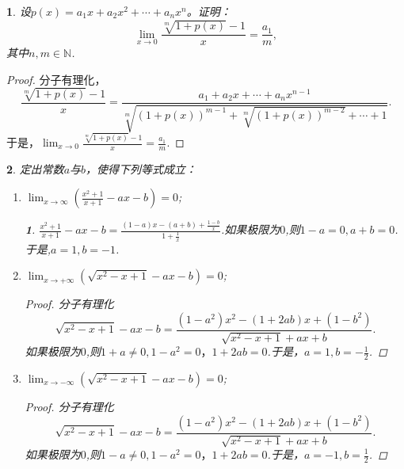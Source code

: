 \documentclass[utf8]{book}
\newtheorem{example}{}[section]             %
\newtheorem{solution}{}
\begin{document}
\begin{example}
设$p(x)=a_1x+a_2x^2+\cdots+a_nx^n$。证明：
$$\displaystyle\lim_{x\to 0}\frac{\sqrt[m]{1+p(x)}-1}{x}=\frac{a_1}{m},$$
其中$n,m\in\mathbb{N}$.
\end{example}
\begin{proof}
分子有理化，
$$\frac{\sqrt[m]{1+p(x)}-1}{x}=\frac{a_1+a_2x+\cdots+a_nx^{n-1}}{\sqrt[m]{(1+p(x))^{m-1}+\sqrt[m]{(1+p(x))^{m-2}}+\cdots + 1}}.$$
于是，$\displaystyle\lim_{x\to 0}\frac{\sqrt[m]{1+p(x)}-1}{x}=\frac{a_1}{m}$.
\end{proof}
\begin{example}
定出常数$a$与$b$，使得下列等式成立：
\renewcommand\labelenumi{\normalfont(\theenumi)}
\begin{enumerate}
\item $\displaystyle\lim_{x\to \infty}\left(\frac{x^2+1}{x+1}-ax-b\right)=0$;
\begin{solution}
$\displaystyle\frac{x^2+1}{x+1}-ax-b = \frac{(1-a)x-(a+b)+\displaystyle\frac{1-b}{x}}{1+\displaystyle\frac{1}{x}}$.如果极限为$0$,则$1-a = 0, a+b = 0$.于是,$a=1,b=-1$.
\end{solution} 
\item $\displaystyle\lim_{x\to +\infty}\left(\sqrt{x^2-x+1}-ax-b\right)=0$;
\begin{proof}分子有理化
$$\sqrt{x^2-x+1}-ax-b=\frac{(1-a^2)x^2-(1+2ab)x+(1-b^2)}{\sqrt{x^2-x+1}+ax+b}.$$
如果极限为$0$,则$1+a\neq 0, 1-a^2 = 0， 1+2ab=0$.于是，$a=1, b=-\frac{1}{2}$.
\end{proof}
\item $\displaystyle\lim_{x\to -\infty}\left(\sqrt{x^2-x+1}-ax-b\right)=0$;
\begin{proof}分子有理化
$$\sqrt{x^2-x+1}-ax-b=\frac{(1-a^2)x^2-(1+2ab)x+(1-b^2)}{\sqrt{x^2-x+1}+ax+b}.$$
如果极限为$0$,则$1-a\neq 0, 1-a^2 = 0， 1+2ab=0$.于是，$a=-1, b=\frac{1}{2}$.
\end{proof}
\end{enumerate}
\end{example}
\end{document}
